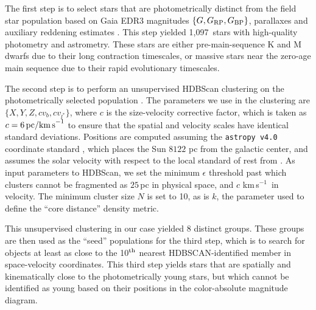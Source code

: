 \documentclass[12pt,twocolumn]{aastex63}
\newcommand{\npms}{1{,}097} %
\newcommand{\kms}{\,km\,s$^{-1}$}
\begin{document}
The first step is to select stars that are photometrically distinct
from the field star population based on Gaia EDR3 magnitudes $\{G,
G_{\rm RP}, G_{\rm BP}\}$, parallaxes and auxiliary reddening
estimates \citep{lallement_gaia-2mass_2019}.  This step yielded \npms\
stars with high-quality photometry and astrometry.  These stars are
either pre-main-sequence K and M dwarfs due to their long contraction
timescales, or massive stars near the zero-age main sequence due to
their rapid evolutionary timescales.

The second step is to perform an unsupervised HDBScan clustering on
the photometrically selected population
\citep{campello_hierarchical_2015,mcinnes_hdbscan_2017}.  The
parameters we use in the clustering are $\{ X, Y, Z, c v_b, c v_{l^*}
\} $, where $c$ is the size-velocity corrective factor, which is taken
as $c=6\,{\rm pc / km\,s}^{-1}$ to ensure that the spatial and
velocity scales have identical standard deviations.  Positions are
computed assuming the \texttt{astropy v4.0} coordinate standard
\citep{astropy_2018}, which places the Sun $8122$ pc from the galactic
center, and assumes the solar velocity with respect to the local
standard of rest from \citet{schonrich_local_2010}.  As input
parameters to HDBScan, we set the minimum $\epsilon$ threshold past
which clusters cannot be fragmented as $25$\,pc in physical space, and
$c$\,\kms\ in velocity.  The minimum cluster size $N$ is set to 10, as
is $k$, the parameter used to define the ``core distance'' density
metric. 

This unsupervised clustering in our case yielded 8 distinct groups.
These groups are then used as the ``seed'' populations for the third
step, which is to search for objects at least as close to the 10$^{\rm
th}$ nearest HDBSCAN-identified member in space-velocity coordinates.
This third step yields stars that are spatially and kinematically
close to the photometrically young stars, but which cannot be
identified as young based on their positions in the color-absolute
magnitude diagram.
\end{document}
